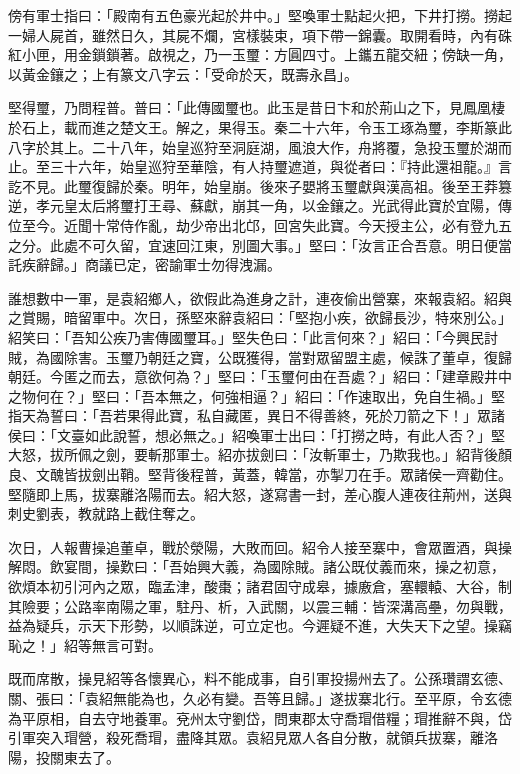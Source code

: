 傍有軍士指曰：「殿南有五色豪光起於井中。」堅喚軍士點起火把，下井打撈。撈起一婦人屍首，雖然日久，其屍不爛，宮樣裝束，項下帶一錦囊。取開看時，內有硃紅小匣，用金鎖鎖著。啟視之，乃一玉璽：方圓四寸。上鑴五龍交紐；傍缺一角，以黃金鑲之；上有篆文八字云：「受命於天，既壽永昌」。

堅得璽，乃問程普。普曰：「此傳國璽也。此玉是昔日卞和於荊山之下，見鳳凰棲於石上，載而進之楚文王。解之，果得玉。秦二十六年，令玉工琢為璽，李斯篆此八字於其上。二十八年，始皇巡狩至洞庭湖，風浪大作，舟將覆，急投玉璽於湖而止。至三十六年，始皇巡狩至華陰，有人持璽遮道，與從者曰：『持此還祖龍。』言訖不見。此璽復歸於秦。明年，始皇崩。後來子嬰將玉璽獻與漢高祖。後至王莽篡逆，孝元皇太后將璽打王尋、蘇獻，崩其一角，以金鑲之。光武得此寶於宜陽，傳位至今。近聞十常侍作亂，劫少帝出北邙，回宮失此寶。今天授主公，必有登九五之分。此處不可久留，宜速回江東，別圖大事。」堅曰：「汝言正合吾意。明日便當託疾辭歸。」商議已定，密諭軍士勿得洩漏。

誰想數中一軍，是袁紹鄉人，欲假此為進身之計，連夜偷出營寨，來報袁紹。紹與之賞賜，暗留軍中。次日，孫堅來辭袁紹曰：「堅抱小疾，欲歸長沙，特來別公。」紹笑曰：「吾知公疾乃害傳國璽耳。」堅失色曰：「此言何來？」紹曰：「今興民討賊，為國除害。玉璽乃朝廷之寶，公既獲得，當對眾留盟主處，候誅了董卓，復歸朝廷。今匿之而去，意欲何為？」堅曰：「玉璽何由在吾處？」紹曰：「建章殿井中之物何在？」堅曰：「吾本無之，何強相逼？」紹曰：「作速取出，免自生禍。」堅指天為誓曰：「吾若果得此寶，私自藏匿，異日不得善終，死於刀箭之下！」眾諸侯曰：「文臺如此說誓，想必無之。」紹喚軍士出曰：「打撈之時，有此人否？」堅大怒，拔所佩之劍，要斬那軍士。紹亦拔劍曰：「汝斬軍士，乃欺我也。」紹背後顏良、文醜皆拔劍出鞘。堅背後程普，黃蓋，韓當，亦掣刀在手。眾諸侯一齊勸住。堅隨即上馬，拔寨離洛陽而去。紹大怒，遂寫書一封，差心腹人連夜往荊州，送與刺史劉表，教就路上截住奪之。

次日，人報曹操追董卓，戰於滎陽，大敗而回。紹令人接至寨中，會眾置酒，與操解悶。飲宴間，操歎曰：「吾始興大義，為國除賊。諸公既仗義而來，操之初意，欲煩本初引河內之眾，臨孟津，酸棗；諸君固守成皋，據廒倉，塞轘轅、大谷，制其險要；公路率南陽之軍，駐丹、析，入武關，以震三輔：皆深溝高壘，勿與戰，益為疑兵，示天下形勢，以順誅逆，可立定也。今遲疑不進，大失天下之望。操竊恥之！」紹等無言可對。

既而席散，操見紹等各懷異心，料不能成事，自引軍投揚州去了。公孫瓚謂玄德、關、張曰：「袁紹無能為也，久必有變。吾等且歸。」遂拔寨北行。至平原，令玄德為平原相，自去守地養軍。兗州太守劉岱，問東郡太守喬瑁借糧；瑁推辭不與，岱引軍突入瑁營，殺死喬瑁，盡降其眾。袁紹見眾人各自分散，就領兵拔寨，離洛陽，投關東去了。

